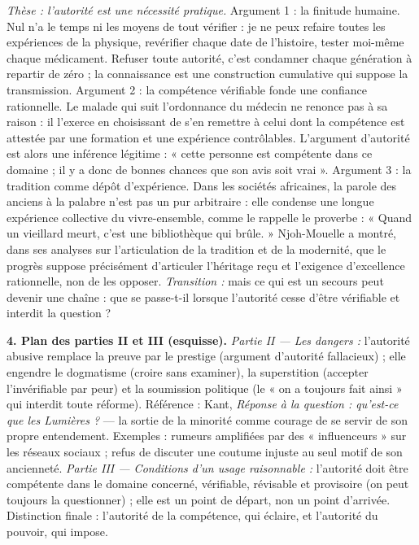 \documentclass[11pt]{article}
\begin{document}
\begin{corrige}
\emph{Thèse : l'autorité est une nécessité pratique.} Argument 1 : la finitude humaine. Nul n'a le temps ni les moyens de tout vérifier : je ne peux refaire toutes les expériences de la physique, revérifier chaque date de l'histoire, tester moi-même chaque médicament. Refuser toute autorité, c'est condamner chaque génération à repartir de zéro ; la connaissance est une construction cumulative qui suppose la transmission. Argument 2 : la compétence vérifiable fonde une confiance rationnelle. Le malade qui suit l'ordonnance du médecin ne renonce pas à sa raison : il l'exerce en choisissant de s'en remettre à celui dont la compétence est attestée par une formation et une expérience contrôlables. L'argument d'autorité est alors une inférence légitime : « cette personne est compétente dans ce domaine ; il y a donc de bonnes chances que son avis soit vrai ». Argument 3 : la tradition comme dépôt d'expérience. Dans les sociétés africaines, la parole des anciens à la palabre n'est pas un pur arbitraire : elle condense une longue expérience collective du vivre-ensemble, comme le rappelle le proverbe : « Quand un vieillard meurt, c'est une bibliothèque qui brûle. » Njoh-Mouelle a montré, dans ses analyses sur l'articulation de la tradition et de la modernité, que le progrès suppose précisément d'articuler l'héritage reçu et l'exigence d'excellence rationnelle, non de les opposer. \emph{Transition :} mais ce qui est un secours peut devenir une chaîne : que se passe-t-il lorsque l'autorité cesse d'être vérifiable et interdit la question ?

\textbf{4. Plan des parties II et III (esquisse).} \emph{Partie II --- Les dangers :} l'autorité abusive remplace la preuve par le prestige (argument d'autorité fallacieux) ; elle engendre le dogmatisme (croire sans examiner), la superstition (accepter l'invérifiable par peur) et la soumission politique (le « on a toujours fait ainsi » qui interdit toute réforme). Référence : Kant, \emph{Réponse à la question : qu'est-ce que les Lumières ?} --- la sortie de la minorité comme courage de se servir de son propre entendement. Exemples : rumeurs amplifiées par des « influenceurs » sur les réseaux sociaux ; refus de discuter une coutume injuste au seul motif de son ancienneté. \emph{Partie III --- Conditions d'un usage raisonnable :} l'autorité doit être compétente dans le domaine concerné, vérifiable, révisable et provisoire (on peut toujours la questionner) ; elle est un point de départ, non un point d'arrivée. Distinction finale : l'autorité de la compétence, qui éclaire, et l'autorité du pouvoir, qui impose.


\end{corrige}
\end{document}
